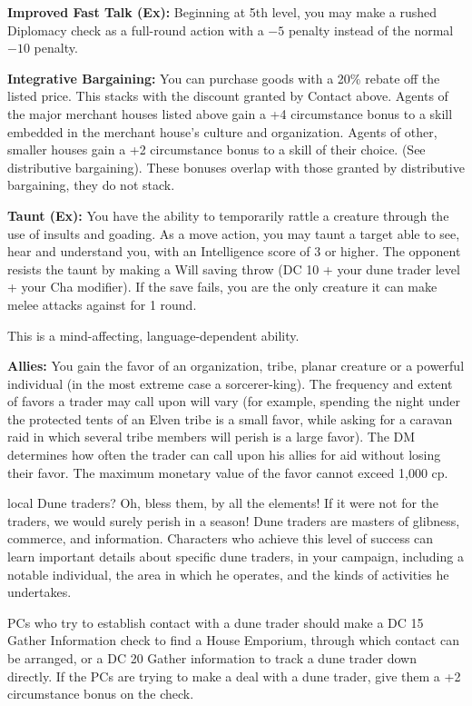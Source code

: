 {\textbf{Improved Fast Talk (Ex):} Beginning at 5th level, you may make a rushed Diplomacy check as a full-round action with a $-5$ penalty instead of the normal $-10$ penalty.

\textbf{Integrative Bargaining:} You can purchase goods with a 20\% rebate off the listed price. This stacks with the discount granted by Contact above. Agents of the major merchant houses listed above gain a +4 circumstance bonus to a skill embedded in the merchant house's culture and organization. Agents of other, smaller houses gain a +2 circumstance bonus to a skill of their choice. (See distributive bargaining). These bonuses overlap with those granted by distributive bargaining, they do not stack.

\textbf{Taunt (Ex):} You have the ability to temporarily rattle a creature through the use of insults and goading. As a move action, you may taunt a target able to see, hear and understand you, with an Intelligence score of 3 or higher. The opponent resists the taunt by making a Will saving throw (DC 10 + your dune trader level + your Cha modifier). If the save fails, you are the only creature it can make melee attacks against for 1 round.

This is a mind-affecting, language-dependent ability.

\textbf{Allies:} You gain the favor of an organization, tribe, planar creature or a powerful individual (in the most extreme case a sorcerer-king). The frequency and extent of favors a trader may call upon will vary (for example, spending the night under the protected tents of an Elven tribe is a small favor, while asking for a caravan raid in which several tribe members will perish is a large favor). The DM determines how often the trader can call upon his allies for aid without losing their favor. The maximum monetary value of the favor cannot exceed 1,000 cp.
}
{}
{local}
{Dune traders? Oh, bless them, by all the elements! If it were not for the traders, we would surely perish in a season!}
{Dune traders are masters of glibness, commerce, and information.}
{Characters who achieve this level of success can learn important details about specific dune traders, in your campaign, including a notable individual, the area in which he operates, and the kinds of activities he undertakes.}

PCs who try to establish contact with a dune trader should make a DC 15 Gather Information check to find a House Emporium, through which contact can be arranged, or a DC 20 Gather information to track a dune trader down directly. If the PCs are trying to make a deal with a dune trader, give them a +2 circumstance bonus on the check.
